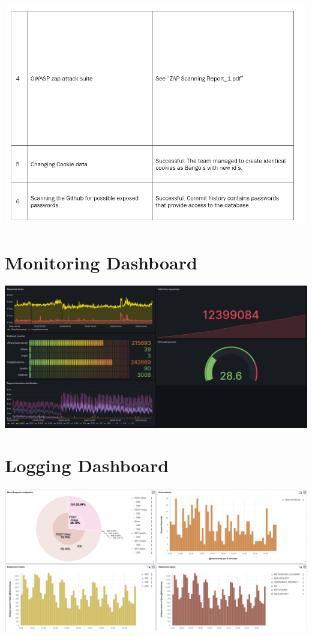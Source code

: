 \includegraphics[width=1\textwidth]{images/Attack P2.png}


\section{Monitoring Dashboard}
\label{appendix:monitoringDashboard}
\includegraphics[width=1\textwidth]{images/MonitoringDashboard.jpg}

\section{Logging Dashboard}
\label{appendix:loggingDashboard}
\includegraphics[width=1\textwidth]{images/LoggingDashboard.png}
